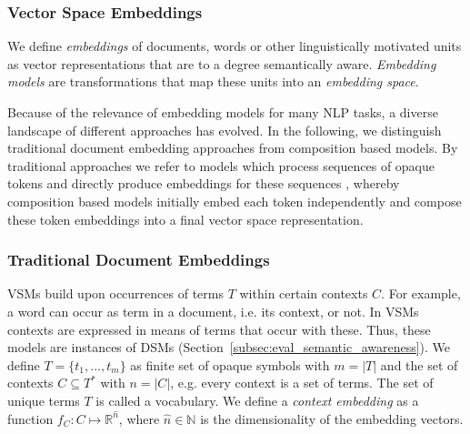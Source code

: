 \subsubsection{Vector Space Embeddings}
We define \textit{embeddings} of documents, words or other linguistically motivated units as vector representations that are to a degree semantically aware. \textit{Embedding models} are transformations that map these units into an \textit{embedding space}.

Because of the relevance of embedding models for many \ac{NLP} tasks, a diverse landscape of different approaches has evolved. In the following, we distinguish traditional document embedding approaches from composition based models. By traditional approaches we refer to models which process sequences of opaque tokens and directly produce embeddings for these sequences \autocite[see][for an exhaustive study]{turney_frequency_2010}, whereby composition based models \autocite{clark_compositional_2008,grefenstette_experimental_2011} initially embed each token independently and compose these token embeddings into a final vector space representation.

\subsubsection{Traditional Document Embeddings}
\label{subsec:doc_embedding}
\acfp{VSM} \autocite{turney_frequency_2010}  build upon occurrences of terms $T$ within certain contexts $C$. For example, a word can occur as term in a document, i.e. its context, or not. In \acp{VSM} contexts are expressed in means of terms that occur with these. Thus, these models are instances of \acp{DSM} (Section~\ref{subsec:eval_semantic_awareness}).  We define $T = \{t_1, ..., t_m\}$ as finite set of opaque symbols with $m = |T|$ and the set of contexts $C \subseteq T^*$ 
with $n = |C|$, e.g. every context is a set of terms. 
The set of unique terms $T$ is called a vocabulary.%
We define a \textit{context embedding} as a function $f_C:C \mapsto \mathbb{R}^{\hat{n}}$, where $\hat{n} \in \mathbb{N}$ is the  dimensionality of the embedding vectors.

